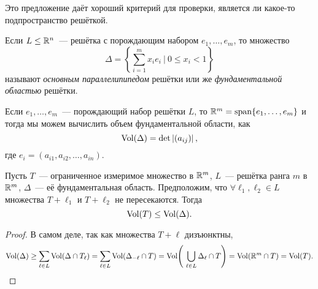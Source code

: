 	Это предложение даёт хороший критерий для проверки, является ли какое-то подпространство решёткой. 

	\begin{definition} 
		Если $L \le \mathbb{R}^n$~--- решётка с порождающим набором $e_1, \ldots, e_m$, то множество 
		\[
			\Delta = \left\{  \sum_{i = 1}^{m} x_i e_i \ \bigg\vert \ 0 \le x_i < 1 \right\}
		\]
		называют \emph{основным параллелипипедом} решётки или же \emph{фундаментальной областью} решётки. 
	\end{definition}

	Если $e_1, \ldots, e_m$~--- порождающий набор решётки $L$, то $\mathbb{R}^m = \operatorname{span}\{ e_1, \ldots, e_m \}$ и тогда 
	мы можем вычислить объем фундаментальной области, как
	\[
		\operatorname{Vol}(\Delta) = \det\left\lvert (a_{i j})\right\rvert,  
	\]
	где $e_i = (a_{i 1}, a_{i 2}, \ldots, a_{i n})$.

	\begin{lemma}\label{lattice_prop_volume}
		Пусть $T$~--- ограниченное измеримое множество в $\mathbb{R}^m$, $L$~--- решётка ранга $m$ в $\mathbb{R}^m$, $\Delta$~--- её фундаментальная область. Предположим, что $\forall \ell_1, \ell_2 \in L $ множества $T + \ell_1$ и $T + \ell_2$ не пересекаются.  Тогда 
		\[
			\operatorname{Vol}(T) \le \operatorname{Vol}(\Delta).
		\]
	\end{lemma}
	\begin{proof}
		В самом деле, так как множества  $T + \ell$ дизъюнктны, 
		\[
			\Vol(\Delta) \ge \sum_{\ell \in L} \Vol(\Delta \cap T_{\ell}) = \sum_{\ell \in L} \Vol(\Delta_{-\ell} \cap T) = \Vol\lr*{\ \bigcup_{\ell \in L} \Delta_{\ell} \cap T} = \Vol(\R^m \cap T) = \Vol(T).
		\]
	\end{proof}

